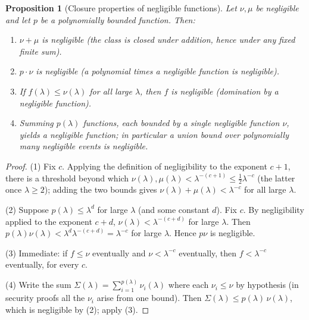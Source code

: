 \documentclass[11pt,a4paper]{article}
\newtheorem{proposition}[theorem]{Proposition}
\theoremstyle{definition}
\theoremstyle{remark}
\begin{document}
\begin{proposition}[Closure properties of negligible functions]\label{probability:prop-negl-closure}
Let \(\nu, \mu\) be negligible and let \(p\) be a polynomially bounded function. Then:
\begin{enumerate}
\item \(\nu + \mu\) is negligible (the class is closed under addition, hence under any fixed finite sum).
\item \(p \cdot \nu\) is negligible (a polynomial times a negligible function is negligible).
\item If \(f(\lambda) \le \nu(\lambda)\) for all large \(\lambda\), then \(f\) is negligible (domination by a negligible function).
\item Summing \(p(\lambda)\) functions, each bounded by a single negligible function \(\nu\), yields a negligible function; in particular a union bound over polynomially many negligible events is negligible.
\end{enumerate}
\end{proposition}

\begin{proof}
(1) Fix \(c\). Applying the definition of negligibility to the exponent \(c+1\), there is a threshold beyond which \(\nu(\lambda), \mu(\lambda) < \lambda^{-(c+1)} \le \tfrac12 \lambda^{-c}\) (the latter once \(\lambda \ge 2\)); adding the two bounds gives \(\nu(\lambda) + \mu(\lambda) < \lambda^{-c}\) for all large \(\lambda\).

(2) Suppose \(p(\lambda) \le \lambda^{d}\) for large \(\lambda\) (and some constant \(d\)). Fix \(c\). By negligibility applied to the exponent \(c + d\), \(\nu(\lambda) < \lambda^{-(c+d)}\) for large \(\lambda\). Then \(p(\lambda)\nu(\lambda) < \lambda^{d}\lambda^{-(c+d)} = \lambda^{-c}\) for large \(\lambda\). Hence \(p\nu\) is negligible.

(3) Immediate: if \(f \le \nu\) eventually and \(\nu < \lambda^{-c}\) eventually, then \(f < \lambda^{-c}\) eventually, for every \(c\).

(4) Write the sum \(\Sigma(\lambda) = \sum_{i=1}^{p(\lambda)} \nu_i(\lambda)\) where each \(\nu_i \le \nu\) by hypothesis (in security proofs all the \(\nu_i\) arise from one bound). Then \(\Sigma(\lambda) \le p(\lambda)\,\nu(\lambda)\), which is negligible by (2); apply (3).
\end{proof}
\end{document}
